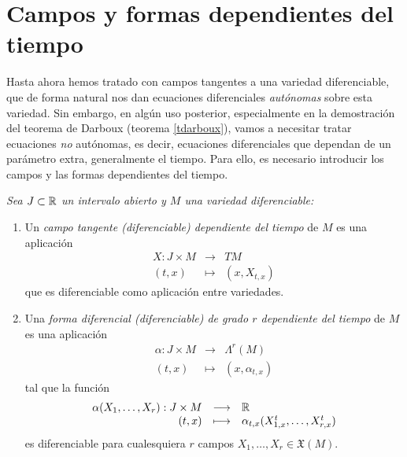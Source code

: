 \section{Campos y formas dependientes del tiempo} \label{sec:tiempo}
Hasta ahora hemos tratado con campos tangentes a una variedad diferenciable, que de forma natural nos dan ecuaciones diferenciales \emph{autónomas} sobre esta variedad. Sin embargo, en algún uso posterior, especialmente en la demostración del teorema de Darboux (teorema \ref{tdarboux}), vamos a necesitar tratar ecuaciones \emph{no} autónomas, es decir, ecuaciones diferenciales que dependan de un parámetro extra, generalmente el tiempo. Para ello, es necesario introducir los campos y las formas dependientes del tiempo.

  \begin{defn} \leavevmode
    \em 
    Sea $ J\subset \mathbb{R} $ un intervalo abierto y $ M $ una variedad diferenciable:
    \begin{enumerate}
      \item Un \emph{campo tangente (diferenciable) dependiente del tiempo} de $M$ es una aplicación \[\begin{array}{rcl}X:J\times M & \longrightarrow & TM \\ (t,x) & \longmapsto & (x,X_{t,x}) \end{array} \] que es diferenciable como aplicación entre variedades. 
      \item Una \emph{forma diferencial (diferenciable) de grado $r$ dependiente del tiempo} de $M$ es una aplicación
	\[\begin{array}{rcl} \alpha: J \times M & \longrightarrow & \varLambda^r(M) \\ (t,x) &  \longmapsto & (x,\alpha_{t,x}) \end{array}\] tal que la función \[\begin{array}{rcl} \alpha(X_1,\dots,X_r):J\times M & \longrightarrow & \mathbb{R} \\ (t,x) & \longmapsto & \alpha_{t,x}(X_{1,x}^t,\dots,X_{r,x}^t)\end{array}\]
	es diferenciable para cualesquiera $r$ campos $X_1,\dots,X_r \in \mathfrak{X}(M)$.
    \end{enumerate}
  \end{defn}

